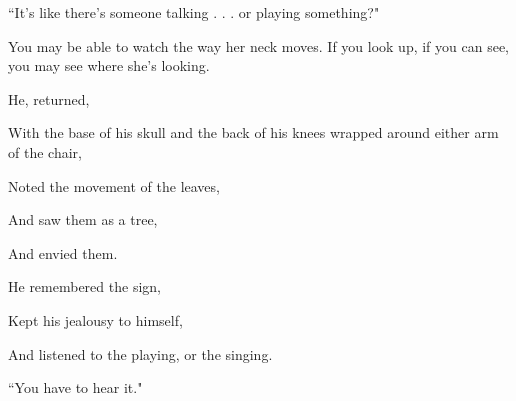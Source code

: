 \documentclass[11pt]{article}
\begin{document}
\vspace*{4\baselineskip}

\begingroup
\begin{center}
``It's like there's someone talking . . . or playing something?"
\end{center}
\endgroup

\vspace*{2\baselineskip}

\begingroup
You may be able to watch the way her neck moves. If you look up, if you can see, you may see where she's looking.
\endgroup

\vspace*{2\baselineskip}

\begingroup
\begin{center}
He, returned,
\end{center}
\endgroup

\begingroup
\begin{center}
With the base of his skull and the back of his knees wrapped around either arm of the chair,
\end{center}
\endgroup

\begingroup
\begin{center}
Noted the movement of the leaves,
\end{center}
\endgroup

\begingroup
\begin{center}
And saw them as a tree,
\end{center}
\endgroup

\begingroup
\begin{center}
And envied them.
\end{center}
\endgroup

\begingroup
\begin{center}
He remembered the sign,
\end{center}
\endgroup

\begingroup
\begin{center}
Kept his jealousy to himself,
\end{center}
\endgroup

\begingroup
\begin{center}
And listened to the playing, or the singing.
\end{center}
\endgroup

\vspace*{2\baselineskip}

\begingroup
\begin{center}
``You have to hear it."
\end{center}
\endgroup
\end{document}
